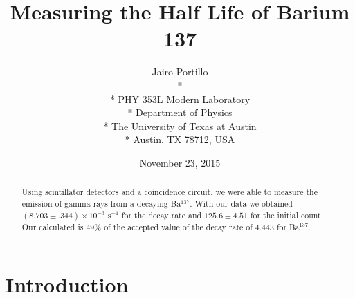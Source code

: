 \documentclass[11pt,letterpaper,onecolumn]{article}
\begin{document}

\title{\bf Measuring the Half Life of Barium 137}

\author{
 Jairo Portillo \\*
  \\*
 PHY 353L Modern Laboratory \\*
 Department of Physics \\*
 The University of Texas at Austin \\*
 Austin, TX 78712, USA
}
\date{November 23, 2015}


\maketitle


\begin{abstract}

Using scintillator detectors and a coincidence circuit, we were able to measure the emission of gamma rays from a decaying Ba$^{137}$. With our data we obtained $(8.703\pm.344)\times10^{-3} \text{ s}^{-1}$ for the decay rate and  $125.6\pm4.51$ for the initial count. Our calculated is $49\%$ of the accepted value of the decay rate of $4.443$ for Ba$^{137}$.


\end{abstract}



\section{Introduction}
\end{document}
